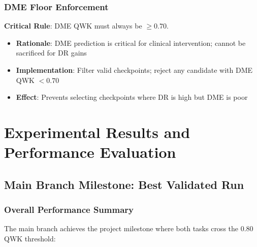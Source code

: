 \documentclass[12pt,a4paper]{article}
\begin{document}
\subsubsection{DME Floor Enforcement}

\textbf{Critical Rule}: DME QWK must always be $\geq 0.70$.

\begin{itemize}
    \item \textbf{Rationale}: DME prediction is critical for clinical intervention; cannot be sacrificed for DR gains
    \item \textbf{Implementation}: Filter valid checkpoints; reject any candidate with DME QWK $< 0.70$
    \item \textbf{Effect}: Prevents selecting checkpoints where DR is high but DME is poor
\end{itemize}

\newpage

\section{Experimental Results and Performance Evaluation}

\subsection{Main Branch Milestone: Best Validated Run}

\subsubsection{Overall Performance Summary}

The main branch achieves the project milestone where both tasks cross the 0.80 QWK threshold:
\end{document}
